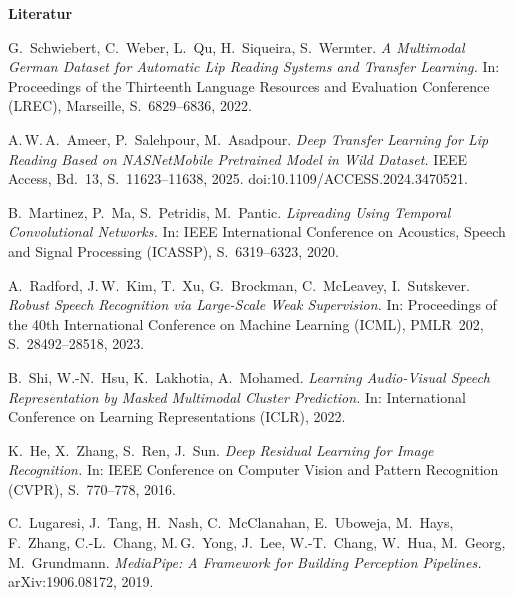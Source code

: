 \documentclass[a0,portrait]{a0poster}
\begin{document}
\newpage
{\color{bwkiblau}\fontsize{46pt}{50pt}\selectfont\bfseries Literatur}\par\vspace{0.8cm}
{\small
\begin{enumerate}[label={[\arabic*]}, leftmargin=2.2em, itemsep=0.6em]
  \item G.~Schwiebert, C.~Weber, L.~Qu, H.~Siqueira, S.~Wermter. \textit{A Multimodal German Dataset
        for Automatic Lip Reading Systems and Transfer Learning.} In: Proceedings of the Thirteenth
        Language Resources and Evaluation Conference (LREC), Marseille, S.~6829--6836, 2022.
  \item A.\,W.\,A.~Ameer, P.~Salehpour, M.~Asadpour. \textit{Deep Transfer Learning for Lip Reading
        Based on NASNetMobile Pretrained Model in Wild Dataset.} IEEE Access, Bd.~13,
        S.~11623--11638, 2025. doi:10.1109/ACCESS.2024.3470521.
  \item B.~Martinez, P.~Ma, S.~Petridis, M.~Pantic. \textit{Lipreading Using Temporal Convolutional
        Networks.} In: IEEE International Conference on Acoustics, Speech and Signal Processing
        (ICASSP), S.~6319--6323, 2020.
  \item A.~Radford, J.\,W.~Kim, T.~Xu, G.~Brockman, C.~McLeavey, I.~Sutskever. \textit{Robust Speech
        Recognition via Large-Scale Weak Supervision.} In: Proceedings of the 40th International
        Conference on Machine Learning (ICML), PMLR~202, S.~28492--28518, 2023.
  \item B.~Shi, W.-N.~Hsu, K.~Lakhotia, A.~Mohamed. \textit{Learning Audio-Visual Speech
        Representation by Masked Multimodal Cluster Prediction.} In: International Conference on
        Learning Representations (ICLR), 2022.
  \item K.~He, X.~Zhang, S.~Ren, J.~Sun. \textit{Deep Residual Learning for Image Recognition.} In:
        IEEE Conference on Computer Vision and Pattern Recognition (CVPR), S.~770--778, 2016.
  \item C.~Lugaresi, J.~Tang, H.~Nash, C.~McClanahan, E.~Uboweja, M.~Hays, F.~Zhang, C.-L.~Chang,
        M.\,G.~Yong, J.~Lee, W.-T.~Chang, W.~Hua, M.~Georg, M.~Grundmann. \textit{MediaPipe: A
        Framework for Building Perception Pipelines.} arXiv:1906.08172, 2019.
\end{enumerate}}
\end{document}
